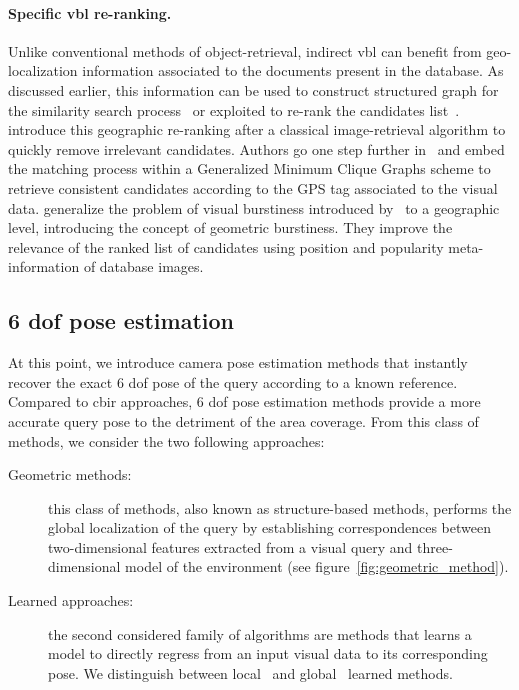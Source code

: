 \paragraph{Specific \ac{vbl} re-ranking.}
Unlike conventional methods of object-retrieval, indirect \ac{vbl} can benefit from geo-localization information associated to the documents present in the database. As discussed earlier, this information can be used to construct structured graph for the similarity search process~\citep{Torii2011,Cao2013} or exploited to re-rank the candidates list~\citep{Zamir2010,Zamir2014,Sattler2016}. \citet{Zamir2010} introduce this geographic re-ranking after a classical image-retrieval algorithm to quickly remove irrelevant candidates. Authors go one step further in~\citep{Zamir2014} and embed the matching process within a Generalized Minimum Clique Graphs scheme to retrieve consistent candidates according to the GPS tag associated to the visual data. \citet{Sattler2016} generalize the problem of visual burstiness introduced by~\citep{Jegou2009} to a geographic level, introducing the concept of geometric burstiness. They improve the relevance of the ranked list of candidates using position and popularity meta-information of database images.

\subsection{6 \acs*{dof} pose estimation}
\label{subsec:fine_pose_estimation}

At this point, we introduce camera pose estimation methods that instantly recover the exact 6 \ac{dof} pose of the query according to a known reference. Compared to \ac{cbir} approaches, 6 \ac{dof} pose estimation methods provide a more accurate query pose to the detriment of the area coverage. From this class of methods, we consider the two following approaches:
\begin{description}
	\item[Geometric methods:] this class of methods, also known as structure-based methods, performs the global localization of the query by establishing correspondences between two-dimensional features extracted from a visual query and three-dimensional model of the environment (see figure~\ref{fig:geometric_method}).
	\item[Learned approaches:] the second considered family of algorithms are methods that learns a model to directly regress from an input visual data to its corresponding pose. We distinguish between local~\citep{Shotton2013} and global~\citep{Kendall2015} learned methods.
\end{description}



